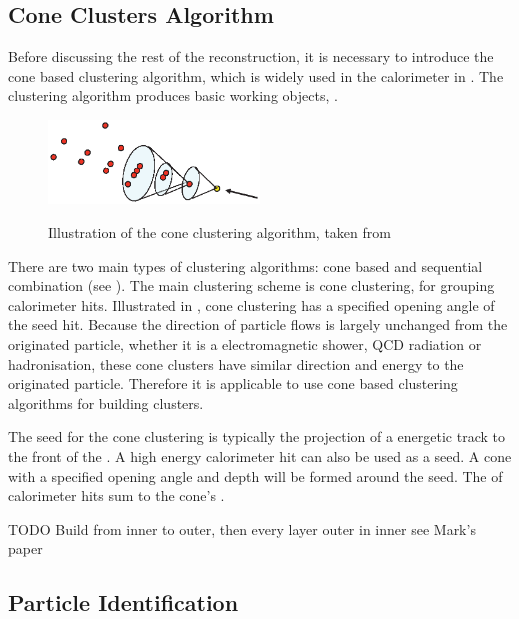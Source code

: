 \subsection{Cone Clusters Algorithm}
\label{sec:pandoraConeCluster}
Before discussing the rest of the \pandora reconstruction, it is necessary to introduce the cone based clustering algorithm, which is widely used in the calorimeter in \pandora. The clustering algorithm produces basic working objects, \clusters.


\begin{figure}[tbph]
\centering
{\includegraphics[width=0.5\textwidth]{pandora/coneClustering}}%
\caption{Illustration of the cone clustering algorithm, taken from \cite{Marshall:pandoraLC}}
\label{fig:pandoraConeClustering}
\end{figure}

There are two main types of clustering algorithms: cone based and sequential combination (see \Section{}). The main clustering scheme \pandora is cone clustering, for grouping calorimeter hits. Illustrated in , cone clustering has a specified opening angle of the seed hit. Because the direction of particle flows is largely unchanged from the originated particle, whether it is a electromagnetic shower, QCD radiation or hadronisation, these cone clusters have similar direction and energy to the originated particle. Therefore it is applicable to use cone based clustering algorithms for building clusters.

The seed for the cone clustering is typically the projection of a energetic track to the front of the \ECAL. A high  energy calorimeter hit can also be used as a seed. A cone with a specified opening angle and depth will be formed around the seed. The \fourMomentum of calorimeter hits sum to the cone's \fourMomentum.

TODO
Build from inner to outer, then every layer outer in inner see Mark's paper

\subsection{Particle Identification}
\label{sec:particleID}

